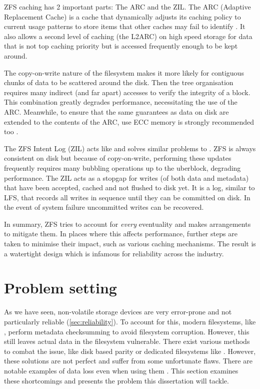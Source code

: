             ZFS caching has 2 important parts: The ARC and the ZIL. The ARC
            (Adaptive Replacement Cache) is a cache that dynamically adjusts
            its caching policy to current usage patterns to store items that
            other caches may fail to identify \cite{ARC}. It also allows a
            second level of caching (the L2ARC) on high speed storage for data
            that is not top caching priority but is accessed frequently enough
            to be kept around.

            The copy-on-write nature of the filesystem makes it more likely for
            contiguous chunks of data to be scattered around the disk. Then the
            tree organisation requires many indirect (and far apart) accesses
            to verify the integrity of a block. This combination greatly
            degrades performance, necessitating the use of the ARC. Meanwhile,
            to ensure that the same guarantees as data on disk are extended to
            the contents of the ARC, use ECC memory is strongly recommended too
            \cite{TrueNAS_hardware_guide}.

            The ZFS Intent Log (ZIL) acts like and solves similar problems to
            . ZFS is always consistent on disk but because
            of copy-on-write, performing these updates frequently requires many
            bubbling operations up to the uberblock, degrading performance. The
            ZIL acts as a stopgap for writes (of both data and metadata) that
            have been accepted, cached and not flushed to disk yet. It is a
            log, similar to LFS, that records all writes in sequence until they
            can be committed on disk. In the event of system failure uncommitted
            writes can be recovered.

            In summary, ZFS tries to account for \textit{every} eventuality and
            makes arrangements to mitigate them. In places where this affects
            performance, further steps are taken to minimise their impact, such
            as various caching mechanisms. The result is a watertight design
            which is infamous for reliability across the industry.

\chapter{Problem setting}

    As we have seen, non-volatile storage devices are very error-prone and not
    particularly reliable (\autoref{sec:reliability}). To account for this, modern
    filesystems, like , perform metadata checksumming to
    avoid filesystem corruption. However, this still leaves actual data in the
    filesystem vulnerable. There exist various methods to combat the issue,
    like disk based parity  or dedicated filesystems like
    . However, these solutions are not perfect and suffer
    from some unfortunate flaws. There are notable examples of data loss even
    when using them \cite{LTT_data_loss}. This section examines these
    shortcomings and presents the problem this dissertation will tackle.

